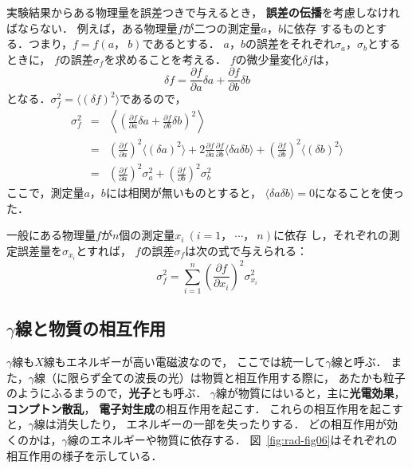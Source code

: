 \documentclass[a4j,10pt,oneside,openany]{jsbook}
\begin{document}
実験結果からある物理量を誤差つきで与えるとき，
{\bf 誤差の伝播}を考慮しなければならない．
例えば，ある物理量$f$が二つの測定量$a$，$b$に依存
するものとする．つまり，$f=f(a，~b)$であるとする．
$a$，$b$の誤差をそれぞれ$\sigma_a$，$\sigma_b$とするときに，
$f$の誤差$\sigma_f$を求めることを考える．
$f$の微少量変化$\delta f$は，
\begin{equation}
  \delta f = \frac{\partial f}{\partial a}\delta a
  + \frac{\partial f}{\partial b}\delta b
\end{equation}
となる．$\sigma_f^2=\langle (\delta f)^2 \rangle$であるので，
\begin{eqnarray}
  \sigma_f^2 &=&
  \left\langle
  \left(
  \frac{\partial f}{\partial a}\delta a
  + \frac{\partial f}{\partial b}\delta b
  \right)^2
  \right\rangle \nonumber \\
  &=&
  \left(\frac{\partial f}{\partial a}\right)^2\langle(\delta a)^2\rangle
  + 2\frac{\partial f}{\partial a}\frac{\partial f}{\partial b}
  \langle\delta a\delta b\rangle
  +\left(\frac{\partial f}{\partial b}\right)^2\langle(\delta b)^2\rangle
  \nonumber \\
  &=&
  \left(\frac{\partial f}{\partial a}\right)^2\sigma_a^2
  + \left(\frac{\partial f}{\partial b}\right)^2\sigma_b^2
\end{eqnarray}
ここで，測定量$a$，$b$には相関が無いものとすると，
$\langle\delta a \delta b\rangle=0$になることを使った．

一般にある物理量$f$が$n$個の測定量$x_i~(i=1，~\cdots，~n)$に依存
し，それぞれの測定誤差量を$\sigma_{x_i}$とすれば，
$f$の誤差$\sigma_f$は次の式で与えられる：
\begin{equation}
  \sigma_f^2=\sum_{i=1}^n
  \left(\frac{\partial f}{\partial x_i}\right)^2 \sigma_{x_i}^2
\end{equation}


\subsection{$\gamma$線と物質の相互作用}

$\gamma$線も$X$線もエネルギーが高い電磁波なので，
ここでは統一して$\gamma$線と呼ぶ．
また，$\gamma$線（に限らず全ての波長の光）は物質と相互作用する際に，
あたかも粒子のようにふるまうので，{\bf 光子}とも呼ぶ．
$\gamma$線が物質にはいると，主に{\bf 光電効果}，{\bf コンプトン散乱}，
{\bf 電子対生成}の相互作用を起こす．
これらの相互作用を起こすと，$\gamma$線は消失したり，
エネルギーの一部を失ったりする．
どの相互作用が効くのかは，$\gamma$線のエネルギーや物質に依存する．
図~\ref{fig:rad-fig06}はそれぞれの相互作用の様子を示している．
\end{document}
